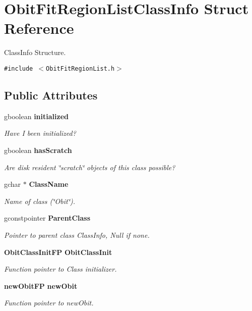 \section{Obit\-Fit\-Region\-List\-Class\-Info Struct Reference}
\label{structObitFitRegionListClassInfo}
Class\-Info Structure.  


{\tt \#include $<$Obit\-Fit\-Region\-List.h$>$}

\subsection*{Public Attributes}
\begin{CompactItemize}
\item 
gboolean {\bf initialized}
\begin{CompactList}\small\item\em Have I been initialized? \item\end{CompactList}\item 
gboolean {\bf has\-Scratch}
\begin{CompactList}\small\item\em Are disk resident \char`\"{}scratch\char`\"{} objects of this class possible? \item\end{CompactList}\item 
gchar $\ast$ {\bf Class\-Name}
\begin{CompactList}\small\item\em Name of class (\char`\"{}Obit\char`\"{}). \item\end{CompactList}\item 
gconstpointer {\bf Parent\-Class}
\begin{CompactList}\small\item\em Pointer to parent class Class\-Info, Null if none. \item\end{CompactList}\item 
{\bf Obit\-Class\-Init\-FP} {\bf Obit\-Class\-Init}
\begin{CompactList}\small\item\em Function pointer to Class initializer. \item\end{CompactList}\item 
{\bf new\-Obit\-FP} {\bf new\-Obit}
\begin{CompactList}\small\item\em Function pointer to new\-Obit. \item\end{CompactList}\item 

\end{CompactItemize}
